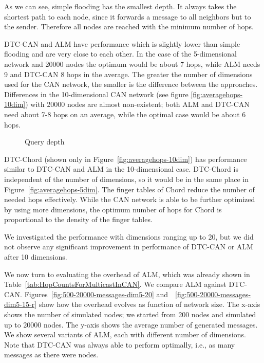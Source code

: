 \documentclass[fleqn,12pt,twoside]{article}
\begin{document}
As we can see, simple flooding has the smallest depth. It always takes
the shortest path to each node, since it forwards a message to all
neighbors but to the sender. Therefore all nodes are reached with the
minimum number of hops.

DTC-CAN and ALM have performance which is slightly lower than simple
flooding and are very close to each other. In the case of the
5-dimensional network and 20000 nodes the optimum would be about 7
hops, while ALM needs 9 and DTC-CAN 8 hops in the average. The greater the number of
dimensions used for the CAN network, the smaller is the difference
between the approaches. Differences in the 10-dimensional CAN network
(see figure \ref{fig:averagehops-10dim}) with 20000 nodes are almost
non-existent; both ALM and DTC-CAN need about 7-8 hops on an average,
while the optimal case would be about 6 hops.

\begin{figure}[!tb]
  \centering
  \caption{Query depth}
  \label{fig:query-depth}
\end{figure}

DTC-Chord (shown only in Figure~\ref{fig:averagehops-10dim}) has
performance similar to DTC-CAN and ALM in the 10-dimensional case.
DTC-Chord is independent of the number of dimensions, so it
would be in the same place in Figure~\ref{fig:averagehops-5dim}. The
finger tables of Chord reduce the number of needed hops effectively.
While the CAN network is able to be further optimized by using more
dimensions, the optimum number of hops for Chord is proportional to
the density of the finger tables.

We investigated the performance with dimensions ranging up to 20, but
we did not observe any significant improvement in performance of
DTC-CAN or ALM after 10 dimensions.


We now turn to evaluating the overhead of ALM, which was already shown
in Table~\ref{tab:HopCountsForMulticastInCAN}. We compare ALM against
DTC-CAN. Figures~\ref{fig:500-20000-messages-dim5-20}
and~~\ref{fig:500-20000-messages-dim5-15-r} show how the overhead
evolves as function of network size. The x-axis shows the number of
simulated nodes; we started from 200 nodes and simulated up to 20000
nodes. The y-axis shows the average number of generated messages. We
show several variants of ALM, each with different number of
dimensions. Note that DTC-CAN was always able to perform optimally,
i.e., as many messages as there were nodes.
\end{document}
